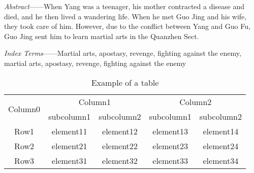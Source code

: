 \documentclass[print, doctor, vlined]{DissertUESTC}
\begin{document}


	\textit{Abstract}——When Yang was a teenager, his mother contracted a disease and died, and he then lived a wandering life. When he met Guo Jing and his wife, they took care of him. However, due to the conflict between Yang and Guo Fu, Guo Jing sent him to learn martial arts in the Quanzhen Sect.

	\textit{Index Terms}——Martial arts, apostasy, revenge, fighting against the enemy, martial arts, apostasy, revenge, fighting against the enemy


	\begin{table}[htp]
		\captionsetup{list=no}%
		\caption{Example of a table}
		\begin{tabular}{ccccc}
			\toprule
			\multirow{2}{*}{Column0} &  \multicolumn{2}{c}{Column1\tnote{1}} & \multicolumn{2}{c}{Column2\tnote{2}} \\
			\cmidrule(lr){2-3}\cmidrule(l){4-5}
			~     & subcolumn1 & subcolumn2 & subcolumn1 & subcolumn2 \\
			\midrule
			Row1  & element11 & element12 &element13 & element14 \\
			Row2  & element21 & element22 &element23 & element24 \\
			\cmidrule{2-3}\cmidrule{4-5}
			Row3  & element31 & element32 &element33 & element34 \\
			\bottomrule
		\end{tabular}
	\end{table}




\end{document}
